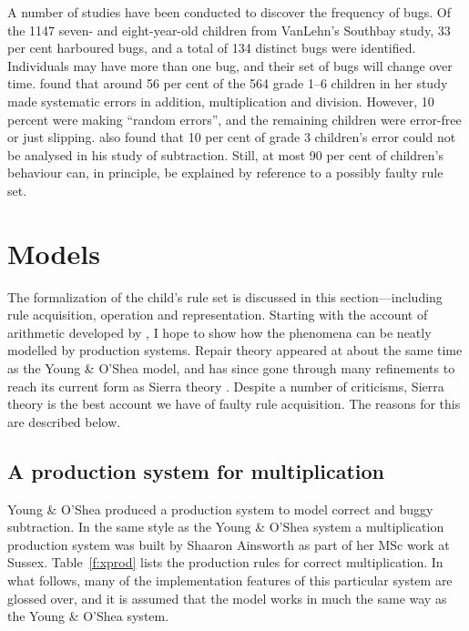 A number of studies have been conducted to discover the frequency of bugs.
Of the 1147 seven- and eight-year-old children from VanLehn's Southbay
study, 33 per cent harboured bugs, and a total of 134 distinct bugs were
identified.  Individuals may have more than one bug, and their set of bugs
will change over time.  found that around 56 per cent of the
564 grade 1--6 children in her study made systematic errors in addition,
multiplication and division. However, 10 percent were making ``random
errors'', and the remaining children were error-free or just slipping.
 also found that 10 per cent of grade 3 children's
error could not be analysed in his study of subtraction.  Still, at most 90
per cent of children's behaviour can,
in principle, be explained by reference to a possibly faulty rule set.


\section{Models}\label{s:mmods}

The formalization of the child's rule set is discussed in this
section---including rule acquisition, operation and representation.
Starting with the account of arithmetic developed by
, I hope to show how the phenomena can be neatly
modelled by production systems.  Repair theory \cite{repair} appeared at
about the same time as the Young \& O'Shea model, and has since gone
through many refinements to reach its current form as Sierra
theory \cite{mindbugs}.  Despite a number of criticisms,
Sierra theory is the best account we have of faulty rule acquisition.  The
reasons for this are described below.

\subsection{A production system for multiplication}


Young \& O'Shea produced a production system to model correct and buggy
subtraction. In the same style as the Young \& O'Shea system a
multiplication production system was built by Shaaron Ainsworth as
part of her MSc work at Sussex.
Table~\ref{f:xprod} lists the production rules for correct multiplication.
In what follows, many of the
implementation features of
this particular system are glossed over,
and it is assumed that the model works in much the same way as the
Young \& O'Shea system.

